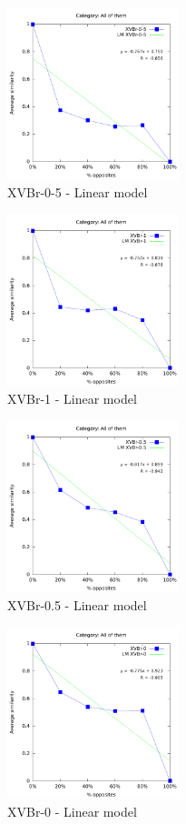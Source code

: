 \documentclass[a4paper,10pt]{article}
\begin{document}
\begin{figure}[ht]{\centering
\includegraphics[height=5cm]{allcat_XVBr-0-5_LM.pdf}
\caption{XVBr-0-5 - Linear model}
}\end{figure}
\begin{figure}[ht]{\centering
\includegraphics[height=5cm]{allcat_XVBr-1_LM.pdf}
\caption{XVBr-1 - Linear model}
}\end{figure}
\begin{figure}[ht]{\centering
\includegraphics[height=5cm]{allcat_XVBr-0_5_LM.pdf}
\caption{XVBr-0.5 - Linear model}
}\end{figure}
\begin{figure}[ht]{\centering
\includegraphics[height=5cm]{allcat_XVBr-0_LM.pdf}
\caption{XVBr-0 - Linear model}
}\end{figure}
\end{document}
